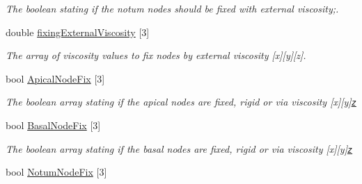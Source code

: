 \begin{DoxyCompactItemize}
\begin{DoxyCompactList}\small\item\em The boolean stating if the notum nodes should be fixed with external viscosity;. \end{DoxyCompactList}\item 
\hypertarget{classSimulation_ac00c2a04cdaf04f28dbe95f1ca6fd934}{}double \hyperlink{classSimulation_ac00c2a04cdaf04f28dbe95f1ca6fd934}{fixing\+External\+Viscosity} \mbox{[}3\mbox{]}\label{classSimulation_ac00c2a04cdaf04f28dbe95f1ca6fd934}

\begin{DoxyCompactList}\small\item\em The array of viscosity values to fix nodes by external viscosity \mbox{[}x\mbox{]}\mbox{[}y\mbox{]}\mbox{[}z\mbox{]}. \end{DoxyCompactList}\item 
\hypertarget{classSimulation_a34b767055f674bf25b1b000c60683447}{}bool \hyperlink{classSimulation_a34b767055f674bf25b1b000c60683447}{Apical\+Node\+Fix} \mbox{[}3\mbox{]}\label{classSimulation_a34b767055f674bf25b1b000c60683447}

\begin{DoxyCompactList}\small\item\em The boolean array stating if the apical nodes are fixed, rigid or via viscosity \mbox{[}x\mbox{]}\mbox{[}y\mbox{]}\href{accompanying boolean array to specify the fixing method Simulation#ApicalNodeFixWithExternalViscosity}{\tt z} \end{DoxyCompactList}\item 
\hypertarget{classSimulation_a1d716c8688103f42b89242d962c9ab1b}{}bool \hyperlink{classSimulation_a1d716c8688103f42b89242d962c9ab1b}{Basal\+Node\+Fix} \mbox{[}3\mbox{]}\label{classSimulation_a1d716c8688103f42b89242d962c9ab1b}

\begin{DoxyCompactList}\small\item\em The boolean array stating if the basal nodes are fixed, rigid or via viscosity \mbox{[}x\mbox{]}\mbox{[}y\mbox{]}\href{accompanying boolean array to specify the fixing method Simulation#BasalNodeFixWithExternalViscosity}{\tt z} \end{DoxyCompactList}\item 
\hypertarget{classSimulation_a6222749d0ee7055efb52974eacbfa074}{}bool \hyperlink{classSimulation_a6222749d0ee7055efb52974eacbfa074}{Notum\+Node\+Fix} \mbox{[}3\mbox{]}\label{classSimulation_a6222749d0ee7055efb52974eacbfa074}


\end{DoxyCompactItemize}
